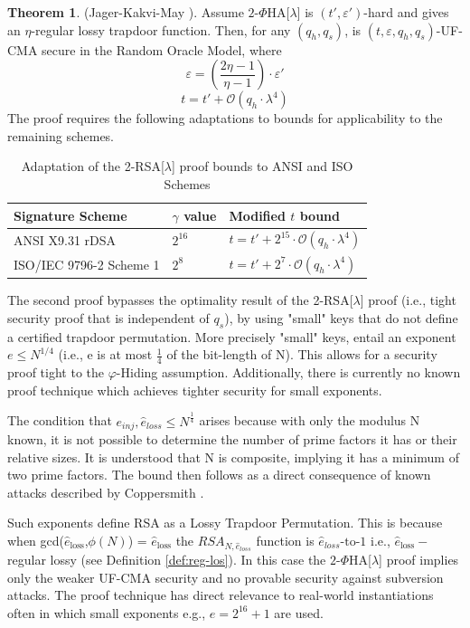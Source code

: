 \documentclass[]{final_report}
\theoremstyle{definition}
\newtheorem{theorem}{Theorem}
\begin{document}
\begin{theorem}
(Jager-Kakvi-May \cite{jager2018security}). Assume \(2\)-\(\Phi\)HA[\(\lambda\)] is \((t', \varepsilon')\)-hard and gives an \(\eta\)-regular lossy trapdoor function. Then, for any \((q_h, q_s)\),  is \((t, \varepsilon, q_h, q_s)\)-UF-CMA secure in the Random Oracle Model, where
\[
\varepsilon = \left(\frac{2\eta - 1}{\eta - 1}\right) \cdot \varepsilon'
\]
\[
t = t' + \mathcal{O}(q_h \cdot \lambda^4)
\]
The proof requires the following adaptations to bounds for applicability to the remaining schemes.
\begin{table}[H]
\centering
\caption{Adaptation of the 2-RSA[\(\lambda\)] proof bounds to ANSI and ISO Schemes}
\begin{tabular}{|m{4.38cm}|m{1.5cm}|m{4.5cm}|}
\hline
\textbf{Signature Scheme} & \textbf{$\gamma$ value} & \textbf{Modified $t$ bound} \\ \hline
ANSI X9.31 rDSA               & \( 2^{16} \)     & \( t = t' + 2^{15} \cdot \mathcal{O}(q_h \cdot \lambda^4) \)     \\ \hline
ISO/IEC 9796-2 Scheme 1        & \( 2^{8} \)       & \( t = t' + 2^7 \cdot \mathcal{O}(q_h \cdot \lambda^4) \)       \\ \hline
\end{tabular}
\label{table:phiAdap}
\end{table}
\end{theorem}


The second proof bypasses the optimality result of the 2-RSA[\(\lambda\)] proof (i.e., tight security proof that is independent of $q_s$), by using "small" keys that do not define a certified trapdoor permutation. More precisely "small" keys, entail an exponent \( e \leqslant N^{1/4} \) (i.e., e is at most $\frac{1}{4}$ of the bit-length of N). This allows for a security proof tight to the $\varphi$-Hiding assumption. Additionally, there is currently no known proof technique which achieves tighter security for small exponents.

The condition that $e_{inj}, \hat{e}_{loss} \le N^{\frac{1}{4}}$ arises because with only the modulus N known, it is not possible to determine the number of prime factors it has or their relative sizes. It is understood that N is composite, implying it has a minimum of two prime factors. The bound then follows as a direct consequence of known attacks described by Coppersmith \cite{coppersmith1997small}.

Such exponents define RSA as a Lossy Trapdoor Permutation. This is because when gcd(\( \hat{e}_{\text{loss}} \),\( \phi(N) \)) = \( \hat{e}_{\text{loss}} \) the $RSA_{N, \hat{e}_{loss}}$ function is \( \hat{e}_{loss}{\text{-to-}}1 \) i.e., \( \hat{e}_{\text{loss}}- \) regular lossy (see Definition \ref{def:reg-los}).  In this case the \(2\)-\(\Phi\)HA[\(\lambda\)] proof implies only the weaker UF-CMA security and no provable security against subversion attacks. The proof technique has direct relevance to real-world instantiations often in which small exponents e.g., $e = 2^{16} + 1$ are used.
\end{document}
